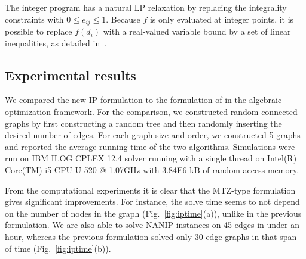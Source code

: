 The integer program has a natural LP relaxation by replacing the integrality
constraints with $0 \leq e_{ij} \leq 1$.  Because $f$ is only evaluated at
integer points, it is possible to replace $f(d_i)$ with a real-valued variable
bound by a set of linear inequalities, as detailed in~\cite{Gutfraind14}.

\subsection{Experimental results}
We compared the new IP formulation to the formulation of \cite{Gutfraind14} in
the algebraic optimization framework.  For the comparison, we constructed
random connected graphs by first constructing a random tree and then randomly
inserting the desired number of edges.  For each graph size and order, we
constructed 5 graphs and reported the average running time of the two
algorithms.  Simulations were run on IBM ILOG CPLEX 12.4 solver running with a
single thread on Intel(R) Core(TM) i5 CPU U 520  @ 1.07GHz with 3.84E6 kB of
random access memory.

From the computational experiments it is clear that the MTZ-type formulation
gives significant improvements.  For instance, the solve time seems to not
depend on the number of nodes in the graph (Fig.~\ref{fig:iptime}(a)), unlike
in the previous formulation.  We are also able to solve NANIP instances on 45
edges in under an hour, whereas the previous formulation solved only 30 edge
graphs in that span of time (Fig.~\ref{fig:iptime}(b)).

